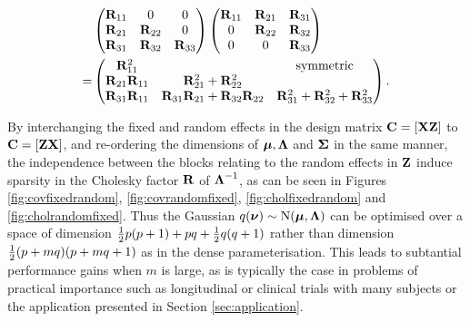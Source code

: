 \documentclass{amsart}[12pt]
\begin{document}
	\begin{align*}
		&\begin{pmatrix}
		{\bf R}_{11}          & 0                                    & 0                                     \\
		{\bf R}_{21}          & {\bf R}_{22}                             & 0                                     \\
		{\bf R}_{31}          & {\bf R}_{32}                             & {\bf R}_{33}                              
		\end{pmatrix}
		\begin{pmatrix}
		{\bf R}_{11}          & {\bf R}_{21}                             & {\bf R}_{31}                              \\
		0                 & {\bf R}_{22}                             & {\bf R}_{32}                              \\
		0                 & 0                                    & {\bf R}_{33}                              
		\end{pmatrix}
		\\
		=& \begin{pmatrix}
		{\bf R}_{11}^2        &                                      & \text{symmetric}                      \\
		{\bf R}_{21}{\bf R}_{11} & {\bf R}_{21}^2 + {\bf R}_{22}^2 \\
		{\bf R}_{31} {\bf R}_{11} & {\bf R}_{31}{\bf R}_{21} + {\bf R}_{32} {\bf R}_{22} & {\bf R}_{31}^2 + {\bf R}_{32} ^2 + {\bf R}_{33}^2 
		\end{pmatrix}.
	\end{align*}
	
	
	By interchanging the fixed and random effects in the design matrix ${\bf C} = [{\bf X} {\bf Z}]$ to ${\bf C} = [{\bf Z} {\bf X}]$, and re-ordering the dimensions of ${\boldsymbol \mu}, {\boldsymbol \Lambda}$ and ${\boldsymbol \Sigma}$ in the same manner, the independence between the
	blocks relating to the random effects in ${\bf Z}$ induce sparsity in the Cholesky factor ${\bf R}$ of
	${\boldsymbol \Lambda}^{-1}$, as can be seen in Figures \ref{fig:covfixedrandom}, \ref{fig:covrandomfixed},
	\ref{fig:cholfixedrandom} and \ref{fig:cholrandomfixed}. Thus the Gaussian $q({\boldsymbol \nu}) \sim \text{N}({\boldsymbol \mu}, {\boldsymbol \Lambda})$ can be optimised over a space of dimension $\tfrac{1}{2} p (p + 1) + pq + \tfrac{1}{2} q (q + 1)$ rather than dimension
	$\tfrac{1}{2} (p + mq) (p + mq + 1)$ as in the dense parameterisation. This leads to subtantial performance gains
	when $m$ is large, as is typically the case in problems of practical importance such as longitudinal or 
	clinical trials with many subjects or the application presented in Section \ref{sec:application}.
		
\end{document}
